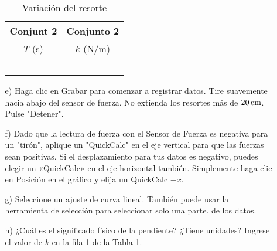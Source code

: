\documentclass[9pt,a4paper,twocolumn,twoside]{tau-class/tau}
\begin{document}
\begin{enumerate}
\begin{itemize}
                \begin{table}[htbp]
                    \centering
                    \begin{tabular}{|c|c|}
                    \hline
                         Conjunt 2 & Conjunto 2\\ \hline
                         $T$ (s) & $k$ (N/m)  \\\hline
                         & \\\hline
                         & \\\hline
                         & \\\hline
                         & \\\hline
                         & \\\hline
                    \end{tabular}
                    \caption{ Variación  del  resorte}
                    \label{tab:02}
                \end{table}
                \item [e)]   Haga  clic  en  Grabar  para  comenzar  a  registrar  datos.  Tire  suavemente  hacia  abajo  del  sensor  de  fuerza.  No extienda  los  resortes  más  de  $20 \,\rm cm$.  Pulse  "Detener".
                \item [f)]  Dado que la lectura de fuerza con el Sensor de Fuerza es negativa para un "tirón", aplique un "QuickCalc" en el eje vertical para que las fuerzas sean positivas. Si el desplazamiento para tus datos es negativo, puedes elegir un «QuickCalc» en el eje horizontal también. Simplemente haga clic en Posición en el gráfico y elija un QuickCalc $-x$.
                \item [g)]    Seleccione  un  ajuste  de  curva  lineal.  También  puede  usar  la  herramienta  de  selección  para  seleccionar  solo  una  parte.  de  los  datos.
                \item [h)]   ¿Cuál  es  el  significado  físico  de  la  pendiente?  ¿Tiene  unidades?  Ingrese  el  valor  de  $k$  en  la  fila  1  de  la  Tabla  \textcolor{blue}{\ref{tab:02}}.
         \end{itemize}
    \end{enumerate}
\end{document}
